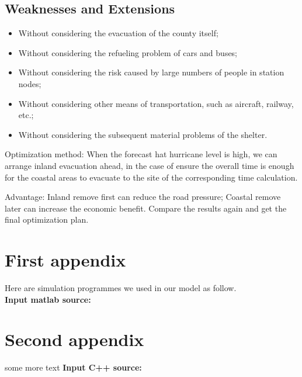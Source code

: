 \documentclass{mcmthesis}
\begin{document}
\subsection{Weaknesses and Extensions}
\begin{itemize}
  \item Without considering the evacuation of the county itself;
  \item Without considering the refueling problem of cars and buses;
  \item Without considering the risk caused by large numbers of people in station nodes;
  \item Without considering other means of transportation, such as aircraft, railway, etc.;
  \item Without considering the subsequent material problems of the shelter.
\end{itemize}

Optimization method: When the forecast hat hurricane level is high, we can arrange inland evacuation ahead, in the case of ensure the overall time is enough for the coastal areas to evacuate to the site of the corresponding time calculation.

Advantage: Inland remove first can reduce the road pressure; Coastal remove later can increase the economic benefit. Compare the results again and get the final optimization plan.




\begin{appendices}

\section{First appendix}

\lipsum[13]

Here are simulation programmes we used in our model as follow.\\

\textbf{\textcolor[rgb]{0.98,0.00,0.00}{Input matlab source:}}
% 

\section{Second appendix}

some more text \textcolor[rgb]{0.98,0.00,0.00}{\textbf{Input C++ source:}}
% 

\end{appendices}
\end{document}
